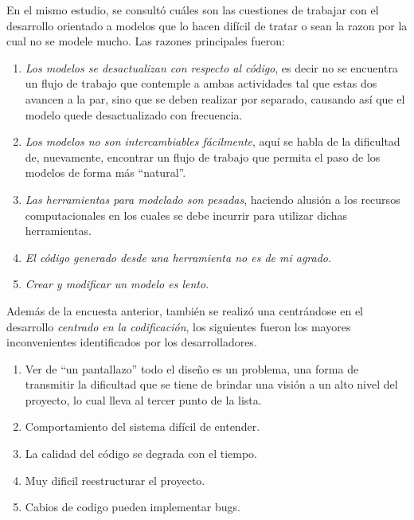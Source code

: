 En el mismo estudio, se consultó cuáles son las cuestiones de trabajar con el
desarrollo orientado a modelos que lo hacen difícil de tratar o sean la razon
por la cual no se modele mucho. Las razones principales fueron:
\begin{enumerate}
	\item \textit{Los modelos se desactualizan con respecto al código},
		es decir no se encuentra un flujo de trabajo que contemple a ambas
		actividades tal que estas dos avancen a la par, sino que se deben
		realizar por separado, causando así que el modelo quede desactualizado
		con frecuencia.
	\item \textit{Los modelos no son intercambiables fácilmente}, aquí se habla de la
		dificultad de, nuevamente, encontrar un flujo de trabajo que permita el paso de
		los modelos de forma más ``natural''.
	\item \textit{Las herramientas para modelado son pesadas}, haciendo alusión a los
		recursos computacionales en los cuales se debe incurrir para utilizar dichas
		herramientas.
		\item \textit{El código generado desde una herramienta no es de mi agrado}.
		\item \textit{Crear y modificar un modelo es lento}.
	\end{enumerate}

Además de la encuesta anterior, también se realizó
una centrándose en el desarrollo \textit{centrado en la codificación}, los
siguientes fueron los mayores inconvenientes identificados por los desarrolladores.

\begin{enumerate}
	\item Ver de ``un pantallazo'' todo el diseño es un problema, una forma de
		transmitir la dificultad que se tiene de brindar una visión a un alto nivel
		del proyecto, lo cual lleva al tercer punto de la lista.
	\item Comportamiento del sistema difícil de entender.
	\item La calidad del código se degrada con el tiempo.
	\item Muy dificil reestructurar el proyecto.
	\item Cabios de codigo pueden implementar bugs.
\end{enumerate}

